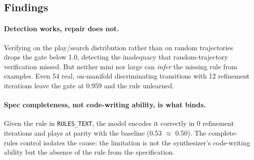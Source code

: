\documentclass[11pt]{article}
\theoremstyle{remark}
\begin{document}
\begin{table}[ht]
\centering
\small
{}
\caption{Repair attempts on the incomplete-rules CWM. Detection works; repair does not.}
\label{tab:repair}
\end{table}

\subsection{Findings}

\paragraph{Detection works, repair does not.} Verifying on the play/search distribution rather than on random trajectories drops the gate below 1.0, detecting the inadequacy that random-trajectory verification missed. But neither mini nor large can \emph{infer} the missing rule from examples. Even 54 real, on-manifold discriminating transitions with 12 refinement iterations leave the gate at 0.959 and the rule unlearned.

\paragraph{Spec completeness, not code-writing ability, is what binds.} Given the rule in \texttt{RULES\_TEXT}, the model encodes it correctly in 0 refinement iterations and plays at parity with the baseline (0.53 $\approx$ 0.50). The complete-rules control isolates the cause: the limitation is not the synthesizer's code-writing ability but the absence of the rule from the specification.
\end{document}
